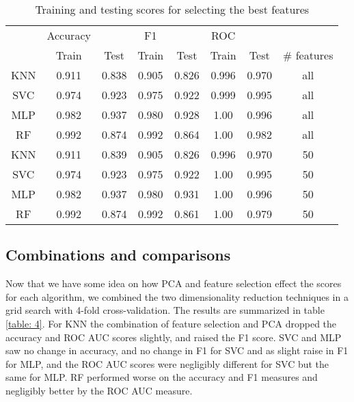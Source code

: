 \documentclass[12pt]{article}
\begin{document}
\begin{table}[h!]
	\centering
	\begin{tabular}{| c|cc| cc| cc|c|} 
		\hline
		&Accuracy&&F1&&ROC&&\\
		& Train & Test & Train & Test & Train & Test & \# features\\ \hline
		KNN & 0.911 & 0.838 & 0.905 & 0.826 & 0.996& 0.970& all\\ 
		SVC & 0.974 & 0.923 & 0.975 & 0.922 & 0.999 & 0.995& all\\ 
		MLP & 0.982 & 0.937 & 0.980 & 0.928 & 1.00 & 0.996& all\\
		RF  & 0.992 & 0.874 & 0.992 & 0.864 & 1.00 & 0.982& all\\
		\hline
		KNN & 0.911 & 0.839 & 0.905 & 0.826 & 0.996& 0.970& 50\\ 
		SVC & 0.974 & 0.923 & 0.975 & 0.922 & 1.00 & 0.995& 50\\ 
		MLP & 0.982 & 0.937 & 0.980 & 0.931 & 1.00 & 0.996& 50\\
		RF  & 0.992 & 0.874 & 0.992 & 0.861 & 1.00 & 0.979& 50\\
		\hline
	\end{tabular}
	\caption{Training and testing scores for selecting the best features}
	\label{table: 3}
\end{table}

\subsection{Combinations and comparisons}

Now that we have some idea on how PCA and feature selection effect the scores for each algorithm, we combined the two dimensionality reduction techniques in a grid search with 4-fold cross-validation. The results are summarized in table \ref{table: 4}.
For KNN the combination of feature selection and PCA dropped the accuracy and ROC AUC scores slightly, and raised the F1 score. SVC and MLP saw no change in accuracy, and no change in F1 for SVC and as slight raise in F1 for MLP, and the ROC AUC scores were negligibly different for SVC but the same for MLP. RF performed worse on the accuracy and F1 measures and negligibly better by the ROC AUC measure.
\end{document}
